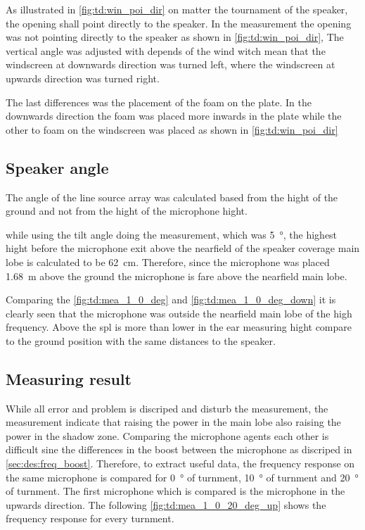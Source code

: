 As illustrated in \autoref{fig:td:win_poi_dir} on matter the tournament of the speaker, the opening shall point directly to the speaker. In the measurement the opening was not pointing directly to the speaker as shown in \autoref{fig:td:win_poi_dir}, The vertical angle was adjusted with depends of the wind witch mean that the windscreen at downwards direction was turned left, where the windscreen at upwards direction was turned right. 

The last differences was the placement of the foam on the plate. In the downwards direction the foam was placed more inwards in the plate while the other to foam on the windscreen was placed as shown in \autoref{fig:td:win_poi_dir}


\subsection{Speaker angle}\label{sec:des:measuring_angle}
The angle of the line source array was calculated based from the hight of the ground and not from the hight of the microphone hight.



while using the tilt angle doing the measurement, which was \SI{5}{\degree}, the highest hight before the microphone exit above the nearfield of the speaker coverage main lobe is calculated to be \SI{62}{\centi\meter}. Therefore, since the microphone was placed \SI{1.68}{\meter} above the ground the microphone is fare above the nearfield main lobe.

Comparing the \autoref{fig:td:mea_1_0_deg} and \autoref{fig:td:mea_1_0_deg_down} it is clearly seen that the microphone was outside the nearfield main lobe of the high frequency. Above  the \gls{spl} is more than  lower in the ear measuring hight compare to the ground position with the same distances to the speaker. 

\subsection{Measuring result}
While all error and problem is discriped and disturb the measurement, the measurement indicate that raising the power in the main lobe also raising the power in the shadow zone. Comparing the microphone agents each other is difficult sine the differences in the boost between the microphone as discriped in \autoref{sec:des:freq_boost}. Therefore, to extract useful data, the frequency response on the same microphone is compared for \SI{0}{\degree} of turnment, \SI{10}{\degree} of turnment and \SI{20}{\degree} of turnment.   
The first microphone which is compared is the microphone in the upwards direction. The following \autoref{fig:td:mea_1_0_20_deg_up} shows the frequency response for every turnment.

